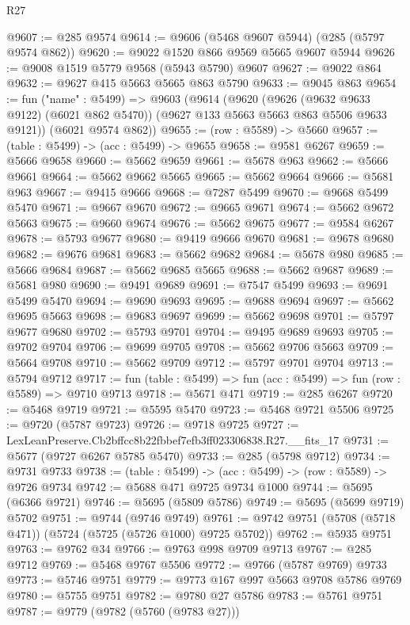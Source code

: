 \begin{lexlean}{R27}
\begin{coremodule}
@9607 := @285 @9574
@9614 := @9606 (@5468 @9607 @5944) (@285 (@5797 @9574 @862))
@9620 := @9022 @1520 @866 @9569 @5665 @9607 @5944
@9626 := @9008 @1519 @5779 @9568 (@5943 @5790) @9607
@9627 := @9022 @864
@9632 := @9627 @415 @5663 @5665 @863 @5790
@9633 := @9045 @863
@9654 := fun ("name" : @5499) =>
  @9603
    (@9614
      (@9620
        (@9626 (@9632 @9633 @9122) (@6021 @862 @5470))
        (@9627 @133 @5663 @5663 @863 @5506 @9633 @9121))
      (@6021 @9574 @862))
@9655 := (row : @5589) -> @5660
@9657 := (table : @5499) -> (acc : @5499) -> @9655
@9658 := @9581 @6267
@9659 := @5666 @9658
@9660 := @5662 @9659
@9661 := @5678 @963
@9662 := @5666 @9661
@9664 := @5662 @9662 @5665
@9665 := @5662 @9664
@9666 := @5681 @963
@9667 := @9415 @9666
@9668 := @7287 @5499
@9670 := @9668 @5499 @5470
@9671 := @9667 @9670
@9672 := @9665 @9671
@9674 := @5662 @9672 @5663
@9675 := @9660 @9674
@9676 := @5662 @9675
@9677 := @9584 @6267
@9678 := @5793 @9677
@9680 := @9419 @9666 @9670
@9681 := @9678 @9680
@9682 := @9676 @9681
@9683 := @5662 @9682
@9684 := @5678 @980
@9685 := @5666 @9684
@9687 := @5662 @9685 @5665
@9688 := @5662 @9687
@9689 := @5681 @980
@9690 := @9491 @9689
@9691 := @7547 @5499
@9693 := @9691 @5499 @5470
@9694 := @9690 @9693
@9695 := @9688 @9694
@9697 := @5662 @9695 @5663
@9698 := @9683 @9697
@9699 := @5662 @9698
@9701 := @5797 @9677 @9680
@9702 := @5793 @9701
@9704 := @9495 @9689 @9693
@9705 := @9702 @9704
@9706 := @9699 @9705
@9708 := @5662 @9706 @5663
@9709 := @5664 @9708
@9710 := @5662 @9709
@9712 := @5797 @9701 @9704
@9713 := @5794 @9712
@9717 := fun (table : @5499) => fun (acc : @5499) => fun (row : @5589) => @9710 @9713
@9718 := @5671 @471
@9719 := @285 @6267
@9720 := @5468 @9719
@9721 := @5595 @5470
@9723 := @5468 @9721 @5506
@9725 := @9720 (@5787 @9723)
@9726 := @9718 @9725
@9727 := LexLeanPreserve.Cb2bffcc8b22fbbef7efb3ff023306838.R27.__fits_17
@9731 := @5677 (@9727 @6267 @5785 @5470)
@9733 := @285 (@5798 @9712)
@9734 := @9731 @9733
@9738 := (table : @5499) -> (acc : @5499) -> (row : @5589) -> @9726 @9734
@9742 := @5688 @471 @9725 @9734 @1000
@9744 := @5695 (@6366 @9721)
@9746 := @5695 (@5809 @5786)
@9749 := @5695 (@5699 @9719) @5702
@9751 := @9744 (@9746 @9749)
@9761 := @9742 @9751 (@5708 (@5718 @471)) (@5724 (@5725 (@5726 @1000) @9725 @5702))
@9762 := @5935 @9751
@9763 := @9762 @34
@9766 := @9763 @998 @9709 @9713
@9767 := @285 @9712
@9769 := @5468 @9767 @5506
@9772 := @9766 (@5787 @9769) @9733
@9773 := @5746 @9751
@9779 := @9773 @167 @997 @5663 @9708 @5786 @9769
@9780 := @5755 @9751
@9782 := @9780 @27 @5786
@9783 := @5761 @9751
@9787 := @9779 (@9782 (@5760 (@9783 @27)))

\end{coremodule}
\end{lexlean}
